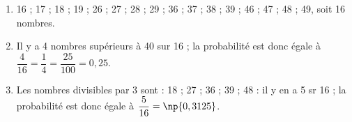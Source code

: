 
\medskip

%
%
%
%
%

\medskip
 
\begin{enumerate}
\item %

16 ; 17 ; 18 ; 19 ; 26 ; 27 ; 28 ; 29 ; 36 ; 37 ; 38 ; 39 ; 46 ; 47 ; 48 ; 49, soit 16 nombres. 
\item %
Il y a 4 nombres supérieurs à 40 sur 16 ; la probabilité est donc égale à $\dfrac{4}{16} = \dfrac{1}{4} = \dfrac{25}{100} = 0,25$.
 
\item %
Les nombres divisibles par 3 sont : 18 ; 27 ; 36 ; 39 ; 48 : il y en a 5 sr 16 ; la probabilité est donc égale à $\dfrac{5}{16} = \np{0,3125}$.
\end{enumerate} 

\vspace{0.5cm}

